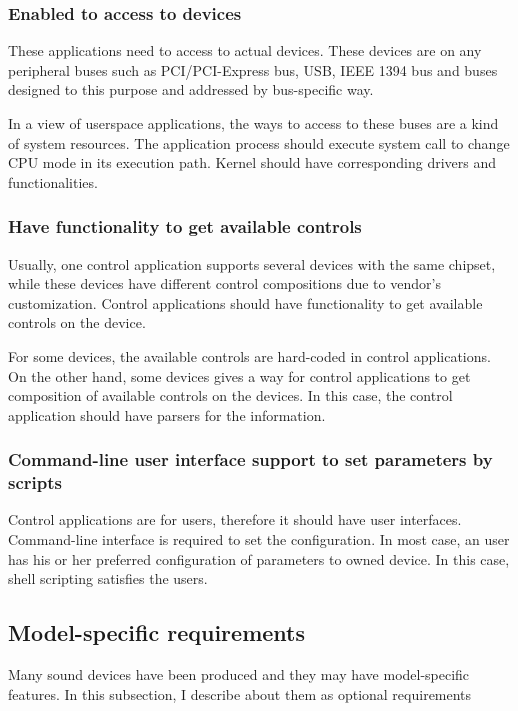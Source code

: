 \documentclass[onecolumn]{article}
\begin{document}
\subsubsection{Enabled to access to devices}

These applications need to access to actual devices. These devices are on any peripheral buses such as PCI/PCI-Express bus, USB, IEEE 1394 bus and buses designed to this purpose and addressed by bus-specific way.

In a view of userspace applications, the ways to access to these buses are a kind of system resources. The application process should execute system call to change CPU mode in its execution path. Kernel should have corresponding drivers and functionalities.


\subsubsection{Have functionality to get available controls}

Usually, one control application supports several devices with the same chipset, while these devices have different control compositions due to vendor's customization. Control applications should have functionality to get available controls on the device.

For some devices, the available controls are hard-coded in control applications. On the other hand, some devices gives a way for control applications to get composition of available controls on the devices. In this case, the control application should have parsers for the information.


\subsubsection{Command-line user interface support to set parameters by scripts}

Control applications are for users, therefore it should have user interfaces. Command-line interface is required to set the configuration. In most case, an user has his or her preferred configuration of parameters to owned device. In this case, shell scripting satisfies the users.


\subsection{Model-specific requirements}

Many sound devices have been produced and they may have model-specific features. In this subsection, I describe about them as optional requirements
\end{document}
